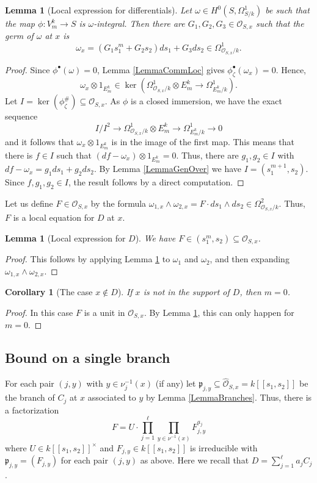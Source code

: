\documentclass[11pt]{amsart}
\newtheorem{corollary}[theorem]{Corollary}
\newtheorem{lemma}[theorem]{Lemma}
\theoremstyle{remark}
\numberwithin{equation}{section}
\newcommand{\pfrak}{\mathfrak{p}}
\newcommand{\Ocal}{\mathscr{O}}
\begin{document}
\begin{lemma}[Local expression for differentials] \label{LemmaLocDiff} Let $\omega\in H^0(S, \Omega^1_{S/k})$ be such that the map $\phi:V_m^k\to S$ is $\omega$-integral. Then there are $G_1,G_2,G_3\in \Ocal_{S,x}$ such that the germ of $\omega$ at $x$ is 
$$
\omega_x=(G_1s_1^m + G_2s_2)ds_1 + G_3ds_2 \in \Omega^1_{\Ocal_{S,x}/k}.
$$
\end{lemma}
\begin{proof} Since $\phi^\bullet(\omega)=0$, Lemma \ref{LemmaCommLoc} gives $\phi^\bullet_{\zeta}(\omega_x)=0$. Hence, 
$$
\omega_x\otimes 1_{E_m^k}\in \ker (\Omega^1_{\Ocal_{S,x}/k}\otimes E_m^k\to \Omega^1_{E_m^k/k}). 
$$
Let $I=\ker(\phi^\#_\zeta)\subseteq \Ocal_{S,x}$. As $\phi$ is a closed immersion, we have the exact sequence
$$
I/I^2\to \Omega^1_{\Ocal_{S,x}/k}\otimes E_m^k\to \Omega^1_{E_m^k/k}\to 0
$$
and it follows that $\omega_x\otimes 1_{E_m^k}$ is in the image of the first map. This means that there is $f\in I$ such that $(df-\omega_x)\otimes 1_{E_m^k}=0$. Thus, there are $g_1,g_2\in I$ with $df-\omega_x=g_1ds_1+g_2ds_2$. By Lemma \ref{LemmaGenOver} we have $I=(s_1^{m+1},s_2)$. Since $f,g_1,g_2\in I$, the result follows by a direct computation.
\end{proof}

Let us define $F\in \Ocal_{S,x}$ by the formula $\omega_{1,x}\wedge\omega_{2,x} = F\cdot ds_1\wedge ds_2\in \Omega^2_{\Ocal_{S,x}/k}$. Thus, $F$ is a local equation for $D$ at $x$. 

\begin{lemma}[Local expression for $D$]\label{LemmaLocD} We have $F\in (s_1^m,s_2)\subseteq \Ocal_{S,x}$.
\end{lemma}
\begin{proof} This follows by applying Lemma \ref{LemmaLocDiff} to $\omega_1$ and $\omega_2$, and then expanding $\omega_{1,x}\wedge \omega_{2,x}$.
\end{proof}

\begin{corollary}[The case $x\notin D$] \label{Corom0} If $x$ is not in the support of $D$, then $m=0$.
\end{corollary}
\begin{proof} In this case $F$ is a unit in $\Ocal_{S,x}$. By Lemma \ref{LemmaLocD}, this can only happen for $m=0$.
\end{proof}
\subsection{Bound on a single branch} For each pair $(j,y)$ with $y\in \nu_j^{-1}(x)$ (if any) let $\pfrak_{j,y}\subseteq \widehat{\Ocal}_{S,x}=k[[s_1,s_2]]$ be the branch of $C_j$ at $x$ associated to $y$ by Lemma \ref{LemmaBranches}. Thus, there is a factorization 
$$
F=U\cdot \prod_{j=1}^\ell \prod_{y\in \nu^{-1}(x)} F_{j,y}^{a_j}
$$
where $U\in k[[s_1,s_2]]^\times$ and $F_{j,y}\in k[[s_1,s_2]]$ is irreducible with $\pfrak_{j,y}=(F_{j,y})$ for each pair $(j,y)$ as above. Here we recall that $D=\sum_{j=1}^\ell a_jC_j$.
\end{document}
